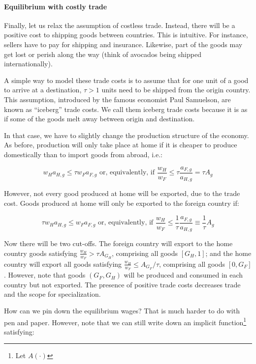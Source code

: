 \documentclass[11pt,letterpaper]{article}
\begin{document}
\paragraph{Equilibrium with costly trade} Finally, let us relax the assumption of costless trade. Instead, there will be a positive cost to shipping goods between countries. This is intuitive. For instance, sellers have to pay for shipping and insurance. Likewise, part of the goods may get lost or perish along the way (think of avocados being shipped internationally).

A simple way to model these trade costs is to assume that for one unit of a good to arrive at a destination, $\tau>1$ units need to be shipped from the origin country. This assumption, introduced by the famous economist Paul Samuelson, are known as ``iceberg'' trade costs. We call them iceberg trade costs because it is as if some of the goods melt away between origin and destination.

In that case, we have to slightly change the production structure of the economy. As before, production will only take place at home if it is cheaper to produce domestically than to import goods from abroad, i.e.: 

    \begin{equation*}
        w_H a_{H,g} \le \tau w_F a_{F,g} \text{ or, equivalently, if } \frac{w_H}{w_F} \le  \tau  \frac{a_{F,g}}{a_{H,g}} = \tau A_g
    \end{equation*}

However, not every good produced at home will be exported, due to the trade cost. Goods produced at home will only be exported to the foreign country if:

\begin{equation*}
        \tau w_H a_{H,g} \le w_F a_{F,g} \text{ or, equivalently, if } \frac{w_H}{w_F} \le  \frac{1}{\tau} \frac{a_{F,g}}{a_{H,g}} \equiv \frac{1}{\tau} A_g
\end{equation*}

Now there will be two cut-offs. The foreign country will export to the home country goods satisfying $\frac{w_H}{w_F} >  \tau A_{G_H}$, comprising all goods $[G_H,1]$; and the home country will export all goods satisfying $\frac{w_H}{w_F} \le  A_{G_F} / \tau$, comprising all goods $[0,G_F]$. However, note that goods $(G_F, G_H)$ will be produced and consumed in each country but not exported. The presence of positive trade costs decreases trade and the scope for specialization.

How can we pin down the equilibrium wages? That is much harder to do with pen and paper. However, note that we can still write down an implicit function\footnote{Let $A(\cdot)$} satisfying:
\end{document}
